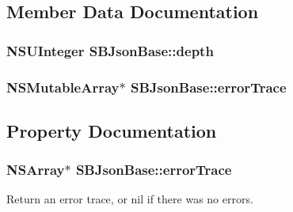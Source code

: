 \subsection{\-Member \-Data \-Documentation}
\hypertarget{interface_s_b_json_base_a5e80155581d240f565ec4149ad812e03}{
\subsubsection[{depth}]{\setlength{\rightskip}{0pt plus 5cm}\-N\-S\-U\-Integer {\bf \-S\-B\-Json\-Base\-::depth}}}
\label{interface_s_b_json_base_a5e80155581d240f565ec4149ad812e03}
\hypertarget{interface_s_b_json_base_a9fd64724d5da34a0f9842cee3d14620c}{
\subsubsection[{error\-Trace}]{\setlength{\rightskip}{0pt plus 5cm}\-N\-S\-Mutable\-Array$\ast$ {\bf \-S\-B\-Json\-Base\-::error\-Trace}}}
\label{interface_s_b_json_base_a9fd64724d5da34a0f9842cee3d14620c}


\subsection{\-Property \-Documentation}
\hypertarget{interface_s_b_json_base_aa83f0ee5efade2fd26ddf6591ffd8dc0}{
\subsubsection[{error\-Trace}]{\setlength{\rightskip}{0pt plus 5cm}\-N\-S\-Array$\ast$ {\bf \-S\-B\-Json\-Base\-::error\-Trace}}}
\label{interface_s_b_json_base_aa83f0ee5efade2fd26ddf6591ffd8dc0}


\-Return an error trace, or nil if there was no errors. 

